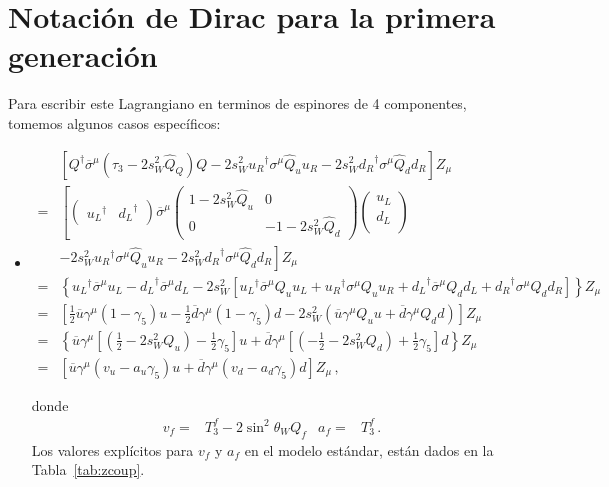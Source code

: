\section{Notación de Dirac para la primera generación}
Para escribir este Lagrangiano en terminos de espinores de 4 componentes, tomemos algunos casos específicos:
\begin{itemize}
\item
  \begin{align}
\label{eq:zf4}
    &\left[ Q^{\dagger}\overline{\sigma}^\mu\left( \tau_3-2s_W^2\widehat{Q}_Q\right)Q
      -2s_W^2{u_R}^{\dagger}\sigma^\mu\widehat{Q}_u u_R-2s_W^2{d_R}^{\dagger}\sigma^\mu\widehat{Q}_d d_R\right]Z_\mu\nonumber\\
=&\left[\begin{pmatrix}
      {u_L}^{\dagger} &{d_L}^{\dagger}
    \end{pmatrix}\overline{\sigma}^\mu
    \begin{pmatrix}
      1-2s_W^2\widehat{Q}_u & 0\\
      0 &-1-2s_W^2\widehat{Q}_d
    \end{pmatrix}
    \begin{pmatrix}
      u_L\\
      d_L\\
    \end{pmatrix}\right.\nonumber\\
    &\left.-2s_W^2{u_R}^{\dagger}\sigma^\mu\widehat{Q}_u u_R-2s_W^2{d_R}^{\dagger}\sigma^\mu\widehat{Q}_d d_R
  \right]Z_\mu\nonumber\\
    =&\left\{{u_L}^{\dagger}\overline{\sigma}^\mu u_L-{d_L}^{\dagger}\overline{\sigma}^\mu d_L
-2s_W^2\left[{u_L}^{\dagger}\overline{\sigma}^{\mu}Q_u u_L+{u_R}^{\dagger}\sigma^\mu Q_uu_R
+{d_L}^{\dagger}\overline{\sigma}^{\mu}Q_d d_L+{d_R}^{\dagger}\sigma^\mu Q_dd_R
\right]\right\}Z_\mu \nonumber\\
          =&\left[\frac{1}{2}\overline{u}\gamma^\mu(1-\gamma_5)u-\frac{1}{2}\overline{d}\gamma^\mu(1-\gamma_5)d
-2s_W^2\left(\overline{u}\gamma^\mu Q_u u
+\overline{d}\gamma^\mu Q_d d
\right)\right]Z_\mu\nonumber\\
        =&\left\{\overline{u}\gamma^\mu\left[\left(\frac{1}{2}-2s_W^2Q_u\right)-\frac{1}{2}\gamma_5\right]u+
\overline{d}\gamma^\mu\left[\left(-\frac{1}{2}-2s_W^2Q_d\right)+\frac{1}{2}\gamma_5\right]d
\right\}Z_\mu\nonumber\\
  =&\left[\overline{u}\gamma^\mu\left(v_u-a_u\gamma_5\right)u+\overline{d}\gamma^\mu\left(v_d-a_d\gamma_5\right)d\right]Z_\mu\,,
\end{align}

donde
\begin{align}
\label{eq:vfaf}
  v_f=&T_3^f-2 \sin^2\theta_WQ_f & a_f=&T_3^f\,.
\end{align}
Los valores explícitos para  $v_f$ y $a_f$ en el modelo estándar, están dados en la Tabla~\ref{tab:zcoup}. 
\end{itemize}


